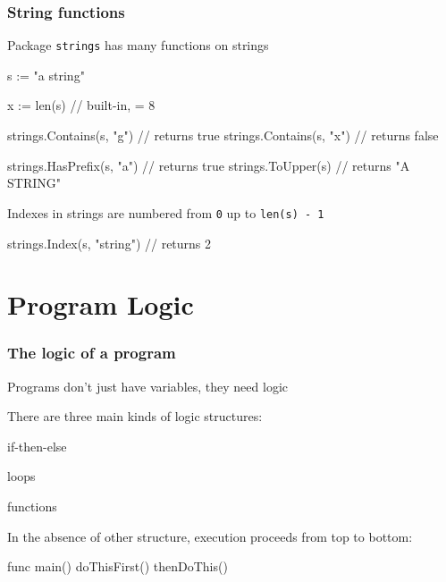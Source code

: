 \documentclass[handout,compress,t,11pt]{beamer}
\begin{document}
\begin{frame}[fragile]
    \frametitle{String functions}
    Package \verb|strings| has many functions on strings
\begin{golang}
s := "a string"

x := len(s)                 // built-in, = 8

strings.Contains(s, "g")    // returns true
strings.Contains(s, "x")    // returns false

strings.HasPrefix(s, "a")   // returns true
strings.ToUpper(s)          // returns "A STRING"
\end{golang}
\vspace{1.5\baselineskip}
Indexes in strings are numbered from \verb|0| up to \verb|len(s) - 1|
\begin{golang}
strings.Index(s, "string")  // returns 2
\end{golang}
\end{frame}


\section{Program Logic}
\begin{frame}[fragile]
    \frametitle{The logic of a program}
    Programs don't just have variables, they need logic \par
    \vspace{0.5\baselineskip}
    There are three main kinds of logic structures:
    
    \begin{description}[labelwidth=\widthof{\bfseries \:\:separating out pieces of logic:},align=right]
    \item [{\color{black} making choices:}] if-then-else
    \item [{\color{black} repeating things:}] loops
    \item [{\color{black} separating out pieces of logic:}] functions
    \end{description}
    \vspace{\baselineskip}
    In the absence of other structure, execution proceeds from top to bottom:
\begin{golang}
func main() {
    doThisFirst()
    thenDoThis()
}
\end{golang}
\end{frame}
\end{document}
